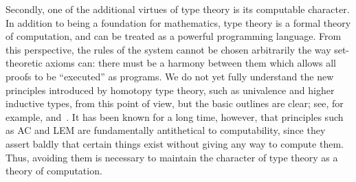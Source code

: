 Secondly, one of the additional virtues of type theory is its computable character.
In addition to being a foundation for mathematics, type theory is a formal theory of computation, and can be treated as a powerful programming language.
From this perspective, the rules of the system cannot be chosen arbitrarily the way set-theoretic axioms can: there must be a harmony between them which allows all proofs to be ``executed'' as programs.
We do not yet fully understand the new principles introduced by homotopy type theory, such as univalence and higher inductive types, from
this point of view, but the basic outlines are clear; see, for example,  and~\cite{lh:canonicity}.
It has been known for a long time, however, that principles such as AC and LEM are fundamentally antithetical to computability, since they assert baldly that certain things exist without giving any way to compute them.
Thus, avoiding them is necessary to maintain the character of type theory as a theory of computation.


